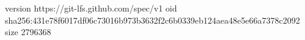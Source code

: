 version https://git-lfs.github.com/spec/v1
oid sha256:431e78f6017df06c73016b973b3632f2c6b0339eb124aea48e5e66a7378c2092
size 2796368
